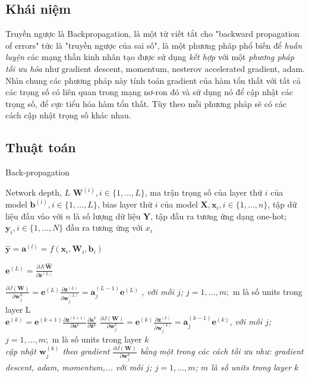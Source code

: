 \subsection{ Khái niệm}

Truyền ngược là Backpropagation, là một từ viết tắt cho "backward propagation of errors" tức là "truyền ngược của sai số", là một phương pháp phổ biến để \textit{huấn luyện} các mạng thần kinh nhân tạo được sử dụng \textit{kết hợp} với một \textit{phương pháp tối ưu hóa} như gradient descent, momentum, nesterov accelerated gradient, adam. Nhìn chung các phương pháp này tính toán gradient của hàm tổn thất với tất cả các trọng số có liên quan trong mạng nơ-ron đó và sử dụng nó để cập nhật các trọng số, để cực tiểu hóa hàm tổn thất. Tùy theo mỗi phương pháp sẽ có các cách cập nhật trọng số khác nhau.
\subsection{Thuật toán}
\begin{algorithm}[H]
\caption{Back-propagation}
\label{al:backward}
\begin{algorithmic}[1]
\REQUIRE Network depth, $L$
\REQUIRE $\textbf{W}^{(i)}, i \in \{1,\ldots,L \}$, ma trận trọng số của layer thứ $i$ của model
\REQUIRE $\textbf{b}^{(i)}, i \in \{1,\ldots,L \}$, bias layer thứ $i$ của model	
\REQUIRE $\textbf{X}, \textbf{x}_i, i \in \{1,\ldots,n \} $, tập dữ liệu đầu vào với $n$ là số lượng dữ liệu
\REQUIRE $\textbf{Y}$, tập đầu ra tương ứng dạng one-hot; $\textbf{y}_i, i\in \{1,\ldots,N\}$ đầu ra tương ứng với $x_i$

\STATE $\widehat{\textbf{y}} = \textbf{a}^{(l)}= f(\textbf{x}_{i},\textbf{W}_{i},\textbf{b}_{i})$

\STATE	$\textbf{e}^{(L)} = \frac{\partial J(\widehat{\textbf{W}}}{\partial \textbf{z}^{(L)}}$

\STATE $\frac{\partial J(\textbf{W})}{\partial \textbf{w}^{L}_j} = \textbf{e}^{(L)} \frac{\partial \textbf{z}^{(L)}}{\partial \textbf{w}^{(L)}_j} = \textbf{a}^{(L-1)}_{j}\textbf{e}^{(L)}$ , \textit{với mỗi $j$; $j =1,\ldots, m;$} m là số units trong layer L \\
		\STATE $\textbf{e}^{(k)}= \textbf{e}^{(k+1)} \frac{\partial  {\textbf{z}^{(k+1)}}}{\partial \textbf{a}^{k}} \frac{\partial\textbf{a}^{k}}{\partial\textbf{z}^{k}} $
		\STATE $\frac{\partial J(\textbf{W})}{\partial \textbf{w}^{k}_j}  =\textbf{e}^{(k)} \frac{\partial \textbf{z}^{(k)}}{\partial \textbf{w}^{(k)}_j} = \textbf{a}^{(k-1)}_{j}\textbf{e}^{(k)}$,  \textit{với mỗi $j$; $j =1,\ldots, m;$} m là số units trong layer $k$ \\
		
	\ENDFOR
	\STATE 	\textit{cập nhật $\textbf{w}^{(k)}_j$ theo gradient $\frac{\partial J(\textbf{W})}{\partial \textbf{w}^{k}_j} $ bằng một trong các cách tối ưu như: gradient descent, adam, momentum,... với mỗi $j$; $j =1,\ldots, m$; $m$ là số units trong layer $k$}
	
	\ENDFOR
\ENDFOR
\end{algorithmic}
\end{algorithm}


